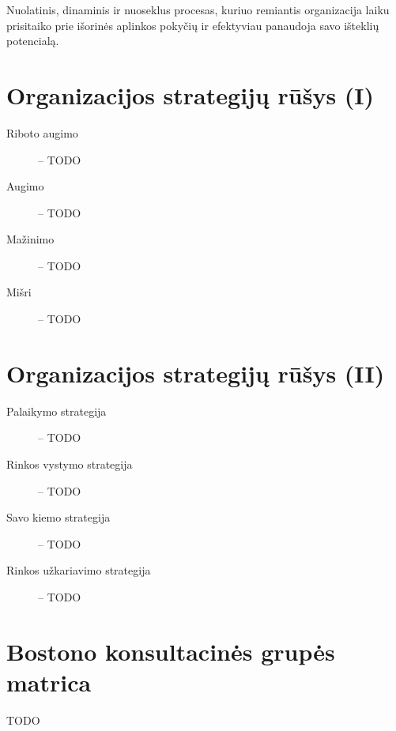 \begin{defn}
  Nuolatinis, dinaminis ir nuoseklus procesas, kuriuo remiantis
  organizacija laiku prisitaiko prie išorinės aplinkos pokyčių ir
  efektyviau panaudoja savo išteklių potencialą.
\end{defn}

\section{Organizacijos strategijų rūšys (I)}

\begin{description}
  \item[Riboto augimo] – TODO
  \item[Augimo] – TODO
  \item[Mažinimo] – TODO
  \item[Mišri] – TODO
\end{description}

\section{Organizacijos strategijų rūšys (II)}

\begin{description}
  \item[Palaikymo strategija] – TODO
  \item[Rinkos vystymo strategija] – TODO
  \item[Savo kiemo strategija] – TODO
  \item[Rinkos užkariavimo strategija] – TODO
\end{description}

\section{Bostono konsultacinės grupės matrica}

TODO
